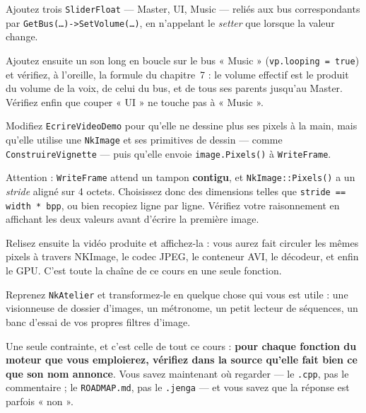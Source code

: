 \begin{nkpratique}[3 — Le mélangeur]
Ajoutez trois \texttt{SliderFloat} — Master, UI, Music — reliés aux bus
correspondants par \texttt{GetBus(\dots)->SetVolume(\dots)}, en n'appelant le
\emph{setter} que lorsque la valeur change.

Ajoutez ensuite un son long en boucle sur le bus « Music »
(\texttt{vp.looping = true}) et vérifiez, à l'oreille, la formule du
chapitre~7 : le volume effectif est le produit du volume de la voix, de celui du
bus, et de tous ses parents jusqu'au Master. Vérifiez enfin que couper « UI » ne
touche pas à « Music ».
\end{nkpratique}

\begin{nkpratique}
Modifiez \texttt{EcrireVideoDemo} pour qu'elle ne dessine plus ses pixels à la
main, mais qu'elle utilise une \texttt{NkImage} et ses primitives de dessin —
comme \texttt{ConstruireVignette} — puis qu'elle envoie
\texttt{image.Pixels()} à \texttt{WriteFrame}.

Attention : \texttt{WriteFrame} attend un tampon \textbf{contigu}, et
\texttt{NkImage::Pixels()} a un \emph{stride} aligné sur 4 octets. Choisissez
donc des dimensions telles que \texttt{stride == width * bpp}, ou bien recopiez
ligne par ligne. Vérifiez votre raisonnement en affichant les deux valeurs avant
d'écrire la première image.

Relisez ensuite la vidéo produite et affichez-la : vous aurez fait circuler les
mêmes pixels à travers NKImage, le codec JPEG, le conteneur AVI, le décodeur, et
enfin le GPU. C'est toute la chaîne de ce cours en une seule fonction.
\end{nkpratique}

\begin{nkpratique}[5 — Le vôtre]
Reprenez \texttt{NkAtelier} et transformez-le en quelque chose qui vous est
utile : une visionneuse de dossier d'images, un métronome, un petit lecteur de
séquences, un banc d'essai de vos propres filtres d'image.

Une seule contrainte, et c'est celle de tout ce cours : \textbf{pour chaque
fonction du moteur que vous emploierez, vérifiez dans la source qu'elle fait
bien ce que son nom annonce}. Vous savez maintenant où regarder — le
\texttt{.cpp}, pas le commentaire ; le \texttt{ROADMAP.md}, pas le
\texttt{.jenga} — et vous savez que la réponse est parfois « non ».
\end{nkpratique}

